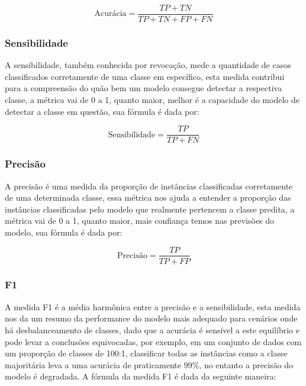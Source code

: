 \begin{equation}
    \text{Acurácia} = \frac{TP + TN}{TP + TN + FP + FN}
\end{equation}

\subsubsection{Sensibilidade}

A sensibilidade, também conhecida por revocação, mede a quantidade de casos classificados corretamente de uma classe em específico, esta medida contribui para a compreensão do quão bem um modelo consegue detectar a respectiva classe, a métrica vai de 0 a 1, quanto maior, melhor é a capacidade do modelo de detectar a classe em questão, sua fórmula é dada por:

\begin{equation}
    \text{Sensibilidade} = \frac{TP}{TP + FN}
\end{equation}

\subsubsection{Precisão}

A precisão é uma medida da proporção de instâncias classificadas corretamente de uma determinada classe, essa métrica nos ajuda a entender a proporção das instâncias classificadas pelo modelo que realmente pertencem a classe predita, a métrica vai de 0 a 1, quanto maior, mais confiança temos nas previsões do modelo, sua fórmula é dada por:

\begin{equation}
    \text{Precisão} = \frac{TP}{TP+FP}
\end{equation}

\subsubsection{F1}

A medida F1 é a média harmônica entre a precisão e a sensibilidade, esta medida nos da um resumo da performance do modelo mais adequado para cenários onde há desbalanceamento de classes, dado que a acurácia é sensível a este equilíbrio e pode levar a conclusões equivocadas, por exemplo, em um conjunto de dados com um proporção de classes de 100:1, classificar todas as instâncias como a classe majoritária leva a uma acurácia de praticamente 99\%, no entanto a precisão do modelo é degradada. A fórmula da medida F1 é dada da seguinte maneira:

